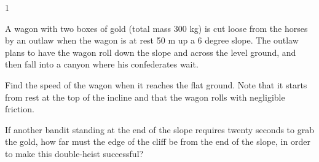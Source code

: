 
\AddToShipoutPicture*{\BackgroundPic}

\addtocounter {ProbNum} {1}

 
{\bf \Large{}} A wagon with two boxes of gold (total mass 300 kg) is cut loose from the horses by an outlaw when the wagon is at rest 50 m up a 6 degree slope. The outlaw plans to have the wagon roll down the slope and across the level ground, and then fall into a canyon where his confederates wait. 

\bigskip
Find the speed of the wagon when it reaches the flat ground. Note that it starts from rest at the top of the incline and that the wagon rolls with negligible friction.

\vfill

\vfill
If another bandit standing at the end of the slope requires twenty seconds to grab the gold, how far must the edge of the cliff be from the end of the slope, in order to make this double-heist successful?



\vfill
\newpage
